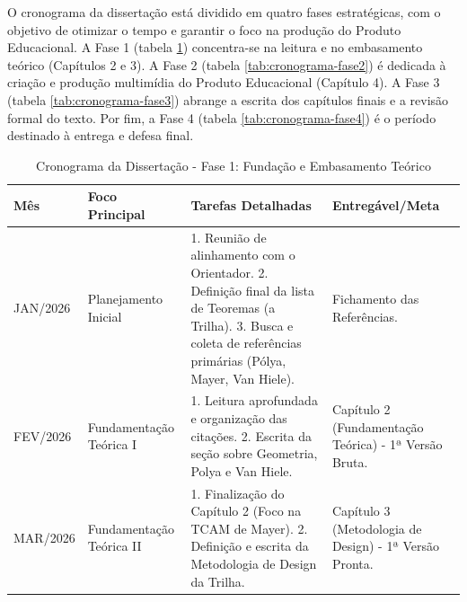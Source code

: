 O cronograma da dissertação está dividido em quatro fases estratégicas, com o objetivo de otimizar o tempo e garantir o foco na produção do Produto Educacional. A Fase 1 (tabela \ref{tab:cronograma-fase1}) concentra-se na leitura e no embasamento teórico (Capítulos 2 e 3). A Fase 2 (tabela \ref{tab:cronograma-fase2}) é dedicada à criação e produção multimídia do Produto Educacional (Capítulo 4). A Fase 3 (tabela \ref{tab:cronograma-fase3}) abrange a escrita dos capítulos finais e a revisão formal do texto. Por fim, a Fase 4 (tabela \ref{tab:cronograma-fase4}) é o período destinado à entrega e defesa final.


\begin{table}[!ht]
    \centering
    \caption{Cronograma da Dissertação - Fase 1: Fundação e Embasamento Teórico}
    
    \begin{tabular}{p{2cm} p{2.5cm} p{7cm} p{2.5cm}}
    \hline
    \textbf{Mês} & \textbf{Foco Principal} & \textbf{Tarefas Detalhadas} & \textbf{Entregável/Meta}\\
    \hline
    JAN/2026 & Planejamento Inicial & 1. Reunião de alinhamento com o Orientador. 2. Definição final da lista de Teoremas (a Trilha). 3. Busca e coleta de referências primárias (Pólya, Mayer, Van Hiele). & Fichamento das Referências.\\
    \hline
    FEV/2026 & Fundamentação Teórica I & 1. Leitura aprofundada e organização das citações. 2. Escrita da seção sobre Geometria, Polya e Van Hiele. & Capítulo 2 (Fundamentação Teórica) - 1ª Versão Bruta.\\
    \hline
    MAR/2026 & Fundamentação Teórica II & 1. Finalização do Capítulo 2 (Foco na TCAM de Mayer). 2. Definição e escrita da Metodologia de Design da Trilha. & Capítulo 3 (Metodologia de Design) - 1ª Versão Pronta.\\
    \hline
    \end{tabular} \label{tab:cronograma-fase1}

\end{table}



